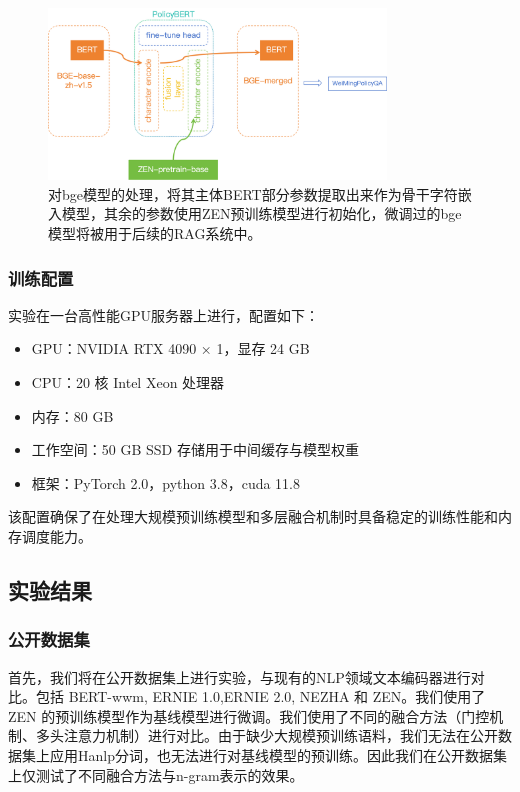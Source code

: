 \documentclass[12pt, a4paper]{ctexart}
\begin{document}
\begin{figure}[H]
    \centering
    \includegraphics[width=0.8\textwidth]{images/model_merge.png}
    \caption{对bge模型的处理，将其主体BERT部分参数提取出来作为骨干字符嵌入模型，其余的参数使用ZEN预训练模型进行初始化，微调过的bge模型将被用于后续的RAG系统中。}
    \label{fig:model_merge}
\end{figure}


\subsubsection{训练配置}
实验在一台高性能GPU服务器上进行，配置如下：

\begin{itemize}
    \item GPU：NVIDIA RTX 4090 × 1，显存 24 GB
    \item CPU：20 核 Intel Xeon 处理器
    \item 内存：80 GB
    \item 工作空间：50 GB SSD 存储用于中间缓存与模型权重
    \item 框架：PyTorch 2.0，python 3.8，cuda 11.8
\end{itemize}

该配置确保了在处理大规模预训练模型和多层融合机制时具备稳定的训练性能和内存调度能力。

\subsection{实验结果}
\subsubsection{公开数据集}
首先，我们将在公开数据集上进行实验，与现有的NLP领域文本编码器进行对比。包括 BERT-wwm, ERNIE 1.0,ERNIE 2.0, NEZHA 和 ZEN。我们使用了 ZEN 的预训练模型作为基线模型进行微调。我们使用了不同的融合方法（门控机制、多头注意力机制）进行对比。由于缺少大规模预训练语料，我们无法在公开数据集上应用Hanlp分词，也无法进行对基线模型的预训练。因此我们在公开数据集上仅测试了不同融合方法与n-gram表示的效果。
\end{document}
